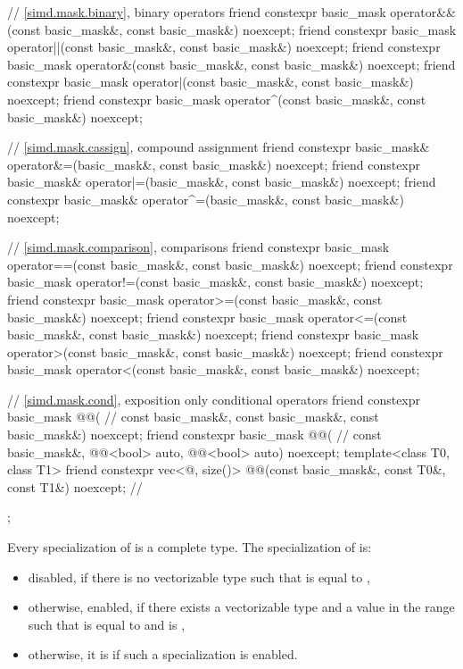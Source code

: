 \begin{codeblock}
{{    // \ref{simd.mask.binary},  binary operators
    friend constexpr basic_mask
      operator&&(const basic_mask&, const basic_mask&) noexcept;
    friend constexpr basic_mask
      operator||(const basic_mask&, const basic_mask&) noexcept;
    friend constexpr basic_mask
      operator&(const basic_mask&, const basic_mask&) noexcept;
    friend constexpr basic_mask
      operator|(const basic_mask&, const basic_mask&) noexcept;
    friend constexpr basic_mask
      operator^(const basic_mask&, const basic_mask&) noexcept;

    // \ref{simd.mask.cassign},  compound assignment
    friend constexpr basic_mask&
      operator&=(basic_mask&, const basic_mask&) noexcept;
    friend constexpr basic_mask&
      operator|=(basic_mask&, const basic_mask&) noexcept;
    friend constexpr basic_mask&
      operator^=(basic_mask&, const basic_mask&) noexcept;

    // \ref{simd.mask.comparison},  comparisons
    friend constexpr basic_mask
      operator==(const basic_mask&, const basic_mask&) noexcept;
    friend constexpr basic_mask
      operator!=(const basic_mask&, const basic_mask&) noexcept;
    friend constexpr basic_mask
      operator>=(const basic_mask&, const basic_mask&) noexcept;
    friend constexpr basic_mask
      operator<=(const basic_mask&, const basic_mask&) noexcept;
    friend constexpr basic_mask
      operator>(const basic_mask&, const basic_mask&) noexcept;
    friend constexpr basic_mask
      operator<(const basic_mask&, const basic_mask&) noexcept;

    // \ref{simd.mask.cond},  exposition only conditional operators
    friend constexpr basic_mask @@( // \expos
      const basic_mask&, const basic_mask&, const basic_mask&) noexcept;
    friend constexpr basic_mask @@( // \expos
      const basic_mask&, @@<bool> auto, @@<bool> auto) noexcept;
    template<class T0, class T1>
      friend constexpr vec<@\seebelow@, size()>
        @@(const basic_mask&, const T0&, const T1&) noexcept; // \expos
  };
}
\end{codeblock}

\pnum
Every specialization of  is a complete type.
The specialization of  is:
\begin{itemize}
 \item
   disabled, if there is no vectorizable type  such that 
   is equal to ,
 \item
   otherwise, enabled, if there exists a vectorizable type  and a
   value  in the range  such that  is equal
   to  and  is ,
 \item
   otherwise, it is  if such a specialization is enabled.
\end{itemize}


